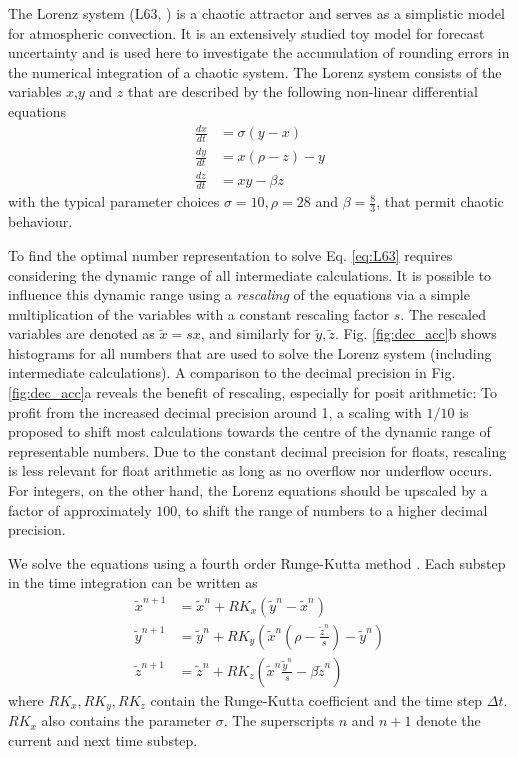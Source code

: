 \documentclass[draft]{agujournal2019}
\begin{document}
The Lorenz system (L63, \cite{Lorenz1963}) is a chaotic attractor and serves as a simplistic model for atmospheric convection. It is an extensively studied toy model for forecast uncertainty \cite{Lorenz1963,Kwasniok2014,Jeffress2017,Tantet2018} and is used here to investigate the accumulation of rounding errors in the numerical integration of a chaotic system. The Lorenz system consists of the variables $x$,$y$ and $z$ that are described by the following non-linear differential equations
\begin{subequations}
\begin{align}
\frac{dx}{dt} &= \sigma(y-x) \\
\frac{dy}{dt} &= x(\rho - z) - y \\
\frac{dz}{dt} &= xy - \beta z
\end{align}
\label{eq:L63}%
\end{subequations}
with the typical parameter choices $\sigma = 10, \rho = 28$ and $\beta = \tfrac{8}{3}$, that permit chaotic behaviour. 

To find the optimal number representation to solve Eq. \ref{eq:L63} requires considering the dynamic range of all intermediate calculations. It is possible to influence this dynamic range using a \emph{rescaling} of the equations via a simple multiplication of the variables with a constant rescaling factor $s$. The rescaled variables are denoted as $\tilde{x} = sx$, and similarly for $\tilde{y},\tilde{z}$. Fig. \ref{fig:dec_acc}b shows histograms for all numbers that are used to solve the Lorenz system (including intermediate calculations). A comparison to the decimal precision in Fig. \ref{fig:dec_acc}a reveals the benefit of rescaling, especially for posit arithmetic: To profit from the increased decimal precision around 1, a scaling with $1/10$ is proposed to shift most calculations towards the centre of the dynamic range of representable numbers. Due to the constant decimal precision for floats, rescaling is less relevant for float arithmetic as long as no overflow nor underflow occurs. For integers, on the other hand, the Lorenz equations should be upscaled by a factor of approximately $100$, to shift the range of numbers to a higher decimal precision.

We solve the equations using a fourth order Runge-Kutta method \cite{Butcher2008}. Each substep in the time integration can be written as 
\begin{subequations}
\begin{align}
\tilde{x}^{n+1} &= \tilde{x}^n + RK_x\left(\tilde{y}^n-\tilde{x}^n\right) \\
\tilde{y}^{n+1} &= \tilde{y}^n + RK_y\left(\tilde{x}^n(\rho - \frac{\tilde{z}^n}{s}) - \tilde{y}^n \right) \\
\tilde{z}^{n+1} &= \tilde{z}^n + RK_z\left(\tilde{x}^n\frac{\tilde{y}^n}{s} - \beta \tilde{z}^n\right)
\end{align}
\label{eq:L63s}%
\end{subequations}
where $RK_x,RK_y,RK_z$ contain the Runge-Kutta coefficient and the time step $\Delta t$.  $RK_x$ also contains the parameter $\sigma$. The superscripts $n$ and $n+1$ denote the current and next time substep.
\end{document}
